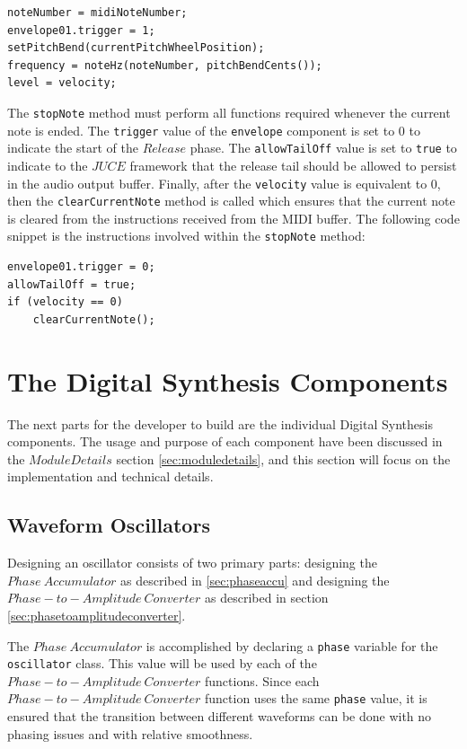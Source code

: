 \documentclass[a4paper,12pt]{report}
\begin{document}
\begin{lstlisting}[caption={startNote()},label={code:startnote},captionpos=b]
noteNumber = midiNoteNumber;
envelope01.trigger = 1;
setPitchBend(currentPitchWheelPosition);
frequency = noteHz(noteNumber, pitchBendCents());
level = velocity;
\end{lstlisting}

The \texttt{stopNote} method must perform all functions required whenever the current note is ended. The \texttt{trigger} value of the \texttt{envelope} component is set to $0$ to indicate the start of the $Release$ phase. The \texttt{allowTailOff} value is set to \texttt{true} to indicate to the $JUCE$ framework that the release tail should be allowed to persist in the audio output buffer. Finally, after the \texttt{velocity} value is equivalent to $0$, then the \texttt{clearCurrentNote} method is called which ensures that the current note is cleared from the instructions received from the MIDI buffer. The following code snippet is the instructions involved within the \texttt{stopNote} method:

\begin{lstlisting}[caption={stopNote()},label={code:stopnote},captionpos=b]
envelope01.trigger = 0;
allowTailOff = true;
if (velocity == 0)
    clearCurrentNote();
\end{lstlisting}


\section{The Digital Synthesis Components}
\label{sec:digitalsynthesiscomponents}
The next parts for the developer to build are the individual Digital Synthesis components. The usage and purpose of each component have been discussed in the $Module Details$ section \ref{sec:moduledetails}, and this section will focus on the implementation and technical details.

\subsection{Waveform Oscillators}
\label{subsec:waveformosc}
Designing an oscillator consists of two primary parts: designing the $Phase\ Accumulator$ as described in \ref{sec:phaseaccu} and designing the $Phase-to-Amplitude\ Converter$ as described in section \ref{sec:phasetoamplitudeconverter}.

The $Phase\ Accumulator$ is accomplished by declaring a \texttt{phase} variable for the \texttt{oscillator} class. This value will be used by each of the $Phase-to-Amplitude\ Converter$ functions. Since each $Phase-to-Amplitude\ Converter$ function uses the same \texttt{phase} value, it is ensured that the transition between different waveforms can be done with no phasing issues and with relative smoothness.
\end{document}
